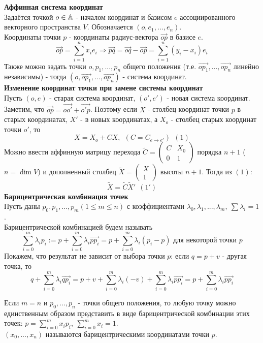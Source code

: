 \textbf{Аффинная система координат}\\
Задаётся точкой $o \in \mathbb{A}$ - началом координат и базисом $e$ ассоциированного векторного пространства $V$. Обозначается $(o, e_1,...,e_n)$.\\
Координаты точки $p$ - координаты радиус-вектора $\overrightarrow{op}$ в базисе $e$.
$$\overrightarrow{op} = \sum \limits_{i=1}^n x_ie_i \Longrightarrow \overrightarrow{pq} = \overrightarrow{oq} - \overrightarrow{op} = \sum \limits_{i=1}^n (y_i - x_i)e_i$$
Также можно задать точки $o, p_1,...,p_n$ общего положения (т.е. $\overrightarrow{op_1},...,\overrightarrow{op_n}$ линейно независимы) - тогда $(o, \overrightarrow{op_1},...,\overrightarrow{op_n})$ - система координат.\\
\textbf{Изменение координат точки при замене системы координат}\\
Пусть $(o, e)$ - старая система координат, $(o', e')$ - новая система координат.\\
Заметим, что $\overrightarrow{op} = \overrightarrow{oo'} + \overrightarrow{o'p}$. Поэтому если $X$ - столбец координат точки $p$ в старых координатах, $X'$ - в новых координатах, а $X_o$ - столбец старых координат точки $o'$, то $$X = X_o + CX, \ \ (C = C_{e\rightarrow e'}) \ \ (1)$$
Можно ввести аффинную матрицу перехода $\tilde{C} = \begin{pmatrix} C&X_0 \\ 0&1 \end{pmatrix}$ порядка $n + 1$ ($n = \dim V$) и дополненный столбец $\tilde{X} = \begin{pmatrix} X \\ 1 \end{pmatrix}$ высоты $n + 1$. Тогда из $(1)$:
$$\tilde{X} = \tilde{C}\tilde{X}' \ \ (1')$$
\textbf{Барицентрическая комбинация точек}\\
Пусть даны $p_0,p_1,...,p_m (1 \leqslant m \leqslant n)$ с коэффициентами $\lambda_0,\lambda_1,...,\lambda_m, \ \sum \lambda_i = 1$.\\
Барицентрической комбинацией будем называть 
$$\sum \limits_{i=0}^m \lambda_ip_i := p + \sum \limits_{i=0}^m \lambda_i \overrightarrow{pp_i} = p + \sum \limits_{i=0}^m \lambda_i(p_i - p)\text{ для некоторой точки } p$$
Покажем, что результат не зависит от выбора точки $p$: если $q = p + v$ - другая точка, то
$$q + \sum \limits_{i=0}^m \lambda_i \overrightarrow{qp_i} = p+ v + \sum \limits_{i=0}^m \lambda_i(-v) + \sum \limits_{i=0}^m \lambda_i \overrightarrow{pp_i} = p + \sum \limits_{i=0}^m \lambda_i \overrightarrow{pp_i}$$
\begin{consequense}
    Если $m = n$ и $p_0,...,p_n$ - точки общего положения, то любую точку можно единственным образом представить в виде барицентрической комбинации этих точек: $p = \sum \limits_{i=0}^m x_ip_i, \ \sum \limits_{i=0}^m x_i = 1$.\\
    $(x_0,...,x_n)$ называются барицентрическими координатами точки $p$.
\end{consequense}
